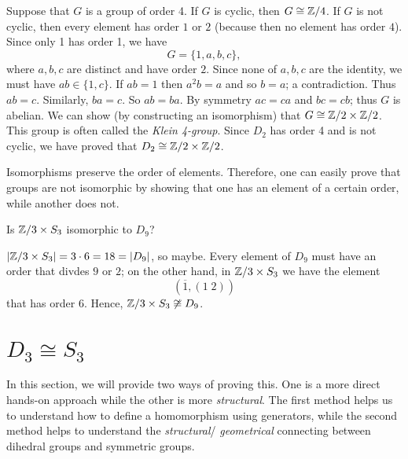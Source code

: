 \begin{example}
    Suppose that $G$ is a group of order 4. If $G$ is cyclic, then $G \cong \mathbb{Z}/4$.
    If $G$ is not cyclic, then every element has order $1$ or $2$
    (because then no element has order $4$).
    Since only 1 has order 1, we have
    \[
        G = \{1,a,b,c\},
    \]
    where $a,b,c$ are distinct and have order $2$.
    Since none of $a,b,c$ are the identity,
    we must have $ab \in \{1,c\}$.
    If $ab = 1$ then $a^2b = a$ and so $b = a$; a contradiction.
    Thus $ab = c$.
    Similarly, $ba = c$. So $ab = ba$. By symmetry $ac = ca$ and $bc = cb$;
    thus $G$ is abelian.
    We can show (by constructing an isomorphism) that 
    $G \cong \mathbb{Z}/2 \times \mathbb{Z}/2$.
    This group is often called the \emph{Klein 4-group}. 
    Since $D_2$ has order 4 and is not cyclic, we have proved that
    $D_2 \cong \mathbb{Z}/2 \times \mathbb{Z}/2$.
\end{example}

Isomorphisms preserve the order of elements.
Therefore, one can easily prove that groups are not isomorphic by
showing that one has an element of a certain order, while another does not.

\begin{example}
    Is $\mathbb{Z}/3 \times S_3$ isomorphic to $D_9$?
\end{example}

\begin{solution}
    $\left\lvert\mathbb{Z}/3 \times S_3\right\rvert = 3 \cdot 6 = 18 = \left\lvert D_9\right\rvert$, so maybe.
    Every element of $D_9$ must have an order that divdes $9$ or $2$;
    on the other hand, in $\mathbb{Z}/3 \times S_3$ we have the element
    \[
        (\overline 1, (1\;2))
    \]
    that has order $6$.
    Hence, $\mathbb{Z}/3 \times S_3 \not\cong D_9$.
\end{solution}

\section{$D_3 \cong S_3$}

In this section, we will provide two ways of proving this.
One is a more direct hands-on approach while the other is more
\emph{structural}.
The first method helps us to understand how to define a homomorphism using
generators, while the second method helps to understand the \emph{structural}/
\emph{geometrical} connecting between dihedral groups and symmetric groups.

